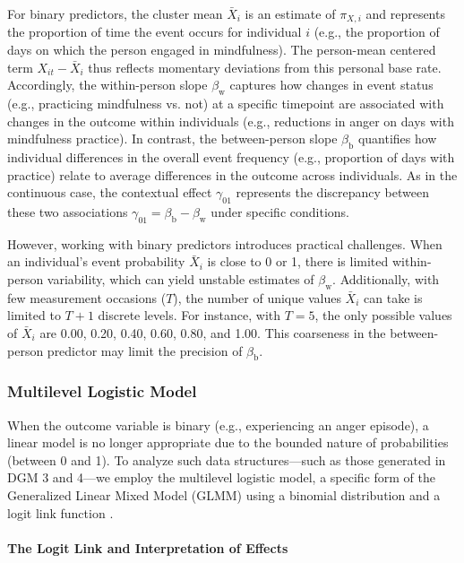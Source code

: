 For binary predictors, the cluster mean \( \bar{X}_i \) is an estimate of $\pi_{X,i}$ and represents the proportion of time the event occurs for individual \( i \) (e.g., the proportion of days on which the person engaged in mindfulness). The person-mean centered term \( X_{it} - \bar{X}_i \) thus reflects momentary deviations from this personal base rate. Accordingly, the within-person slope \( \beta_\text{w} \) captures how changes in event status (e.g., practicing mindfulness vs. not) at a specific timepoint are associated with changes in the outcome within individuals (e.g., reductions in anger on days with mindfulness practice). In contrast, the between-person slope \( \beta_\text{b} \) quantifies how individual differences in the overall event frequency (e.g., proportion of days with practice) relate to average differences in the outcome across individuals. As in the continuous case, the contextual effect \( \gamma_{01} \) represents the discrepancy between these two associations $\gamma_{01} = \beta_\text{b} - \beta_\text{w}$ under specific conditions.

However, working with binary predictors introduces practical challenges. When an individual’s event probability \( \bar{X}_i \) is close to 0 or 1, there is limited within-person variability, which can yield unstable estimates of \( \beta_\text{w} \). Additionally, with few measurement occasions (\( T \)), the number of unique values \( \bar{X}_i \) can take is limited to \( T + 1 \) discrete levels. For instance, with \( T = 5 \), the only possible values of \( \bar{X}_i \) are 0.00, 0.20, 0.40, 0.60, 0.80, and 1.00. This coarseness in the between-person predictor may limit the precision of \( \beta_\text{b} \).

\subsubsection{Multilevel Logistic Model}

When the outcome variable is binary (e.g., experiencing an anger episode), a linear model is no longer appropriate due to the bounded nature of probabilities (between 0 and 1). To analyze such data structures—such as those generated in DGM 3 and 4—we employ the multilevel logistic model, a specific form of the Generalized Linear Mixed Model (GLMM) using a binomial distribution and a logit link function \parencite{anderson_variance_1985, stiratelli_random-effects_1984}.

\paragraph{The Logit Link and Interpretation of Effects}


